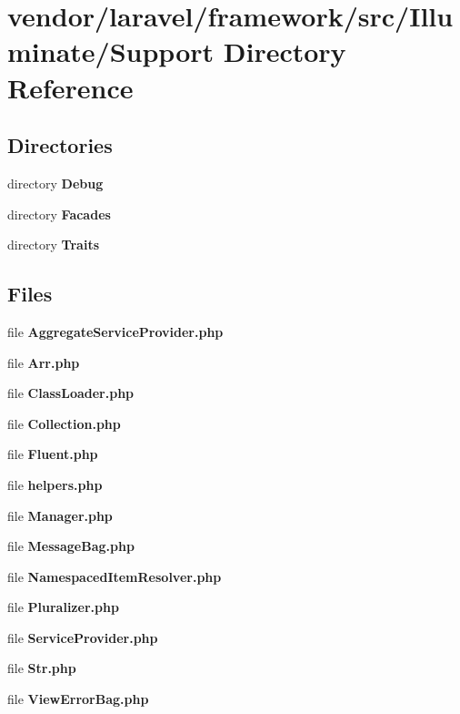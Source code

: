 \section{vendor/laravel/framework/src/\+Illuminate/\+Support Directory Reference}
\label{dir_3a7e9275ab85451d82be85f09def750e}
\subsection*{Directories}
\begin{DoxyCompactItemize}
\item 
directory {\bf Debug}
\item 
directory {\bf Facades}
\item 
directory {\bf Traits}
\end{DoxyCompactItemize}
\subsection*{Files}
\begin{DoxyCompactItemize}
\item 
file {\bf Aggregate\+Service\+Provider.\+php}
\item 
file {\bf Arr.\+php}
\item 
file {\bf Class\+Loader.\+php}
\item 
file {\bf Collection.\+php}
\item 
file {\bf Fluent.\+php}
\item 
file {\bf helpers.\+php}
\item 
file {\bf Manager.\+php}
\item 
file {\bf Message\+Bag.\+php}
\item 
file {\bf Namespaced\+Item\+Resolver.\+php}
\item 
file {\bf Pluralizer.\+php}
\item 
file {\bf Service\+Provider.\+php}
\item 
file {\bf Str.\+php}
\item 
file {\bf View\+Error\+Bag.\+php}
\end{DoxyCompactItemize}
